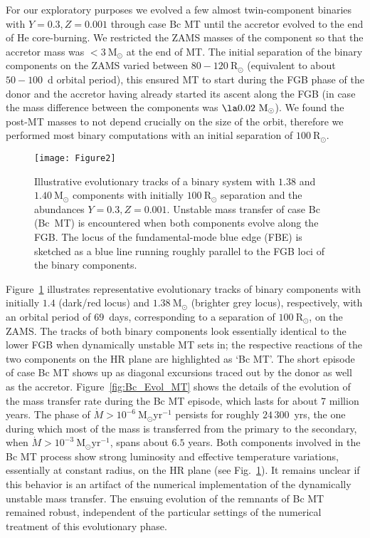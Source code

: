 \documentclass[a4paper,fleqn,usenatbib]{mnras}
\newcommand{\msol}{~\mathrm{M}_\odot}
\newcommand{\rsol}{~\mathrm{R}_\odot}
\begin{document}
For our exploratory purposes we evolved a few almost twin-component 
binaries with $Y=0.3, Z=0.001$ through case Bc MT until the accretor evolved to the
end of He core-burning. We restricted the ZAMS masses of the component so that the accretor mass 
was $< 3 \msol$ at the end of MT. The initial separation of the binary components on the ZAMS 
varied between $80 - 120 \rsol$ (equivalent to about $50 - 100$~d orbital period), 
this ensured MT to start during the FGB phase of the donor 
and the accretor having already started its ascent along the FGB 
(in case the mass difference between the components was $\la 0.02 \msol$).
We found the post-MT masses to not depend crucially on the size of the orbit, therefore
we performed most binary computations with an initial separation of $100 \rsol$.

\begin{figure}
	\texttt{[image: Figure2]}
    \caption{Illustrative evolutionary tracks of a binary system with $1.38$ and 
    	     $1.40 \msol$ components with initially $100\rsol$ separation and 
    	     the abundances $Y=0.3, Z=0.001$. Unstable mass transfer of case 
    	     Bc (Bc~MT) is encountered when both components evolve along the FGB.
    	     The locus of the fundamental-mode blue edge (FBE) is sketched 
    	     as a blue line running roughly parallel to the FGB loci 
    	     of the binary components.
    	    }
    \label{fig:Bc_Evol}
\end{figure}

Figure~\ref{fig:Bc_Evol} illustrates representative evolutionary tracks of binary components
with initially $1.4$ (dark/red locus) and $1.38 \msol$ (brighter grey locus), respectively, with an orbital period of $69$~days, corresponding to a separation of $100 \rsol$, on the ZAMS.
The tracks of both binary components look essentially identical to the lower FGB 
when dynamically unstable MT sets in; the respective reactions of the two components 
on the HR plane are highlighted as `Bc MT'. The short episode of case Bc MT shows up as 
diagonal excursions traced out by the donor as well as the accretor.
Figure~\ref{fig:Bc_Evol_MT} shows the details of the evolution of the 
mass transfer rate during the Bc MT episode, which lasts for about 7 million years. The phase
of $\dot{M} > 10^{-6} \msol \mathrm{yr}^{-1}$ persists for roughly $24\,300$~yrs, the one during 
which most of the mass is transferred from the primary to the secondary, 
when $\dot{M} > 10^{-3} \msol \mathrm{yr}^{-1}$, spans about 
$6.5$ years. Both components involved in the Bc MT process show strong luminosity and
effective temperature variations, essentially at constant radius, on the HR plane
(see Fig.~\ref{fig:Bc_Evol}). It remains unclear if this behavior is an artifact of the 
numerical implementation of the dynamically unstable mass transfer. 
The ensuing evolution of the remnants of Bc MT remained robust, independent of 
the particular settings of the numerical treatment of this evolutionary phase.
\end{document}
